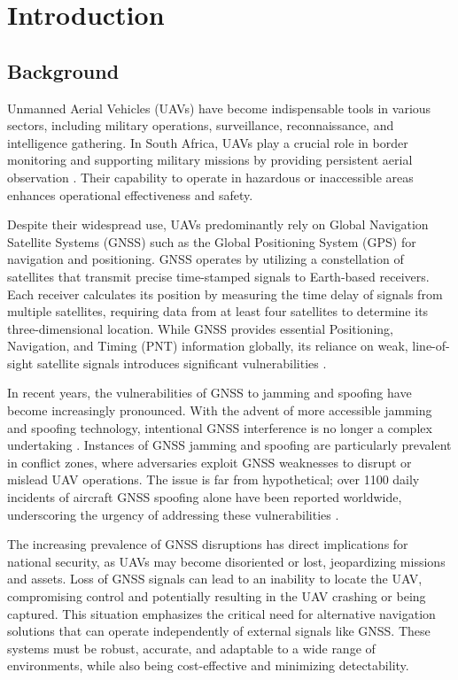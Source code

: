
\chapter{Introduction}
\label{chap:introduction}




\section{Background}

Unmanned Aerial Vehicles (UAVs) have become indispensable tools in various sectors, including military operations, surveillance, reconnaissance, and intelligence gathering. In South Africa, UAVs play a crucial role in border monitoring and supporting military missions by providing persistent aerial observation \cite{Weiss2024}. Their capability to operate in hazardous or inaccessible areas enhances operational effectiveness and safety.

Despite their widespread use, UAVs predominantly rely on Global Navigation Satellite Systems (GNSS) such as the Global Positioning System (GPS) for navigation and positioning. GNSS operates by utilizing a constellation of satellites that transmit precise time-stamped signals to Earth-based receivers. Each receiver calculates its position by measuring the time delay of signals from multiple satellites, requiring data from at least four satellites to determine its three-dimensional location. While GNSS provides essential Positioning, Navigation, and Timing (PNT) information globally, its reliance on weak, line-of-sight satellite signals introduces significant vulnerabilities \cite{geotab2024gps}.

In recent years, the vulnerabilities of GNSS to jamming and spoofing have become increasingly pronounced. With the advent of more accessible jamming and spoofing technology, intentional GNSS interference is no longer a complex undertaking \cite{khalil2024gnss}. Instances of GNSS jamming and spoofing are particularly prevalent in conflict zones, where adversaries exploit GNSS weaknesses to disrupt or mislead UAV operations. The issue is far from hypothetical; over 1100 daily incidents of aircraft GNSS spoofing alone have been reported worldwide, underscoring the urgency of addressing these vulnerabilities \cite{khalil2024gnss}.

The increasing prevalence of GNSS disruptions has direct implications for national security, as UAVs may become disoriented or lost, jeopardizing missions and assets. Loss of GNSS signals can lead to an inability to locate the UAV, compromising control and potentially resulting in the UAV crashing or being captured. This situation emphasizes the critical need for alternative navigation solutions that can operate independently of external signals like GNSS. These systems must be robust, accurate, and adaptable to a wide range of environments, while also being cost-effective and minimizing detectability.

